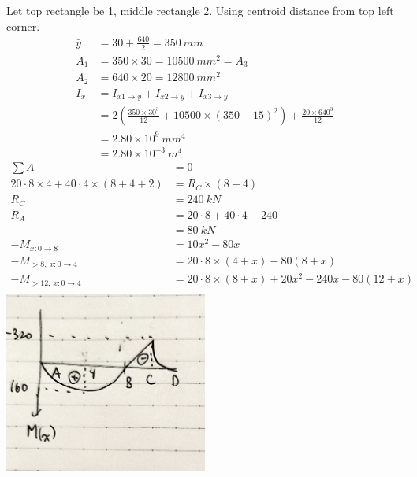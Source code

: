 \documentclass{article}
\begin{document}
Let top rectangle be 1, middle rectangle 2. Using centroid distance from top left corner.
\begin{align*}
    \bar{y} & = 30 + \frac{640}{2} = 350\ mm                                               \\
    A_1     & = 350 \times 30 = 10500\ mm^2 = A_3                                          \\
    A_2     & = 640 \times 20 = 12800\ mm^2                                                \\
    I_x     & = I_{x1\to\bar{y}} + I_{x2\to\bar{y}} + I_{x3\to\bar{y}}                     \\
            & = 2(\frac{350\times30^3}{12}+10500\times(350-15)^2)+\frac{20\times640^3}{12} \\
            & = 2.80\times10^9\ mm^4                                                       \\
            & = 2.80\times10^{-3}\ m^4
\end{align*}
\begin{align*}
    \sum A                                & = 0                                       \\
    20\cdot8\times4+40\cdot4\times(8+4+2) & =R_C\times(8+4)                           \\
    R_C                                   & = 240\ kN                                 \\
    R_A                                   & = 20\cdot8+40\cdot4-240                   \\
                                          & = 80\ kN                                  \\
    -M_{x:0\to8}                          & = 10x^2-80x                               \\
    -M_{>8,\ x:0\to4}                     & = 20\cdot8\times(4+x)-80(8+x)             \\
    -M_{>12,\ x:0\to4}                    & = 20\cdot8\times(8+x)+20x^2-240x-80(12+x) \\
\end{align*}
\includegraphics[width=0.5\textwidth]{img/A3Q5-1.jpeg}
\end{document}
